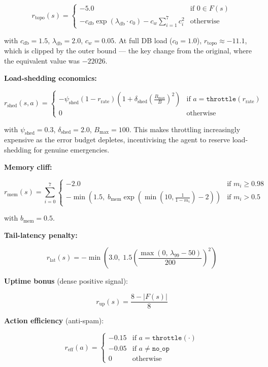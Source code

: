 \documentclass{article}
\begin{document}
\[
r_{\mathrm{topo}}(s) = \begin{cases}
-5.0 & \text{if } 0 \in F(s) \\
-c_{\mathrm{db}} \exp(\lambda_{\mathrm{db}} \cdot c_0) - c_w \displaystyle\sum_{i=1}^{7} c_i^2 & \text{otherwise}
\end{cases}
\]

with $c_{\mathrm{db}} = 1.5$, $\lambda_{\mathrm{db}} = 2.0$, $c_w = 0.05$.
At full DB load ($c_0 = 1.0$), $r_{\mathrm{topo}} \approx -11.1$, which is clipped by
the outer bound --- the key change from the original, where the equivalent value was
$-22026$.

\textbf{Load-shedding economics:}

\[
r_{\mathrm{shed}}(s, a) = \begin{cases}
-\psi_{\mathrm{shed}} (1 - r_{\mathrm{rate}}) \left(1 + \delta_{\mathrm{shed}} \left(\tfrac{B_{\max}}{B}\right)^2\right) & \text{if } a = \texttt{throttle}(r_{\mathrm{rate}}) \\
0 & \text{otherwise}
\end{cases}
\]

with $\psi_{\mathrm{shed}} = 0.3$, $\delta_{\mathrm{shed}} = 2.0$, $B_{\max} = 100$.
This makes throttling increasingly expensive as the error budget depletes, incentivising
the agent to reserve load-shedding for genuine emergencies.

\textbf{Memory cliff:}

\[
r_{\mathrm{mem}}(s) = \sum_{i=0}^{7} \begin{cases}
-2.0 & \text{if } m_i \geq 0.98 \\
-\min\!\left(1.5,\; b_{\mathrm{mem}} \exp\!\left(\min\!\left(10, \tfrac{1}{1-m_i}\right) - 2\right)\right) & \text{if } m_i > 0.5
\end{cases}
\]

with $b_{\mathrm{mem}} = 0.5$.

\textbf{Tail-latency penalty:}

\[
r_{\mathrm{lat}}(s) = -\min\!\left(3.0,\; 1.5 \left(\frac{\max(0,\, \lambda_{99} - 50)}{200}\right)^2\right)
\]

\textbf{Uptime bonus} (dense positive signal):

\[
r_{\mathrm{up}}(s) = \frac{8 - |F(s)|}{8}
\]

\textbf{Action efficiency} (anti-spam):

\[
r_{\mathrm{eff}}(a) = \begin{cases}
-0.15 & \text{if } a = \texttt{throttle}(\cdot) \\
-0.05 & \text{if } a \neq \texttt{no\_op} \\
0 & \text{otherwise}
\end{cases}
\]
\end{document}
